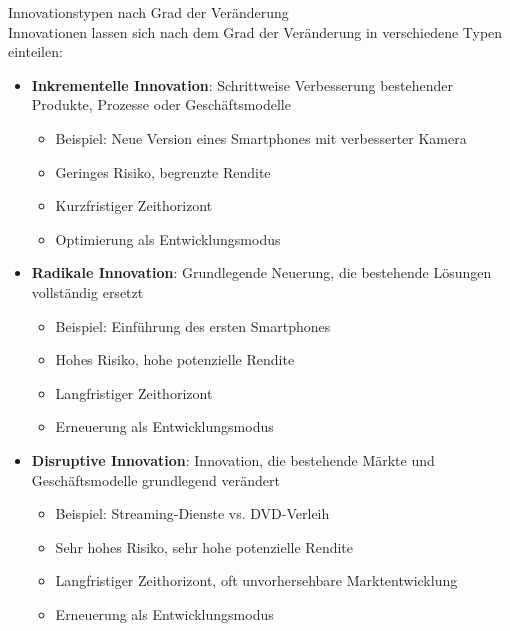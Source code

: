 \begin{concept}{Innovationstypen nach Grad der Veränderung}\\
Innovationen lassen sich nach dem Grad der Veränderung in verschiedene Typen einteilen:
\begin{itemize}
    \item \textbf{Inkrementelle Innovation}: Schrittweise Verbesserung bestehender Produkte, Prozesse oder Geschäftsmodelle
    \begin{itemize}
        \item Beispiel: Neue Version eines Smartphones mit verbesserter Kamera
        \item Geringes Risiko, begrenzte Rendite
        \item Kurzfristiger Zeithorizont
        \item Optimierung als Entwicklungsmodus
    \end{itemize}
    \item \textbf{Radikale Innovation}: Grundlegende Neuerung, die bestehende Lösungen vollständig ersetzt
    \begin{itemize}
        \item Beispiel: Einführung des ersten Smartphones
        \item Hohes Risiko, hohe potenzielle Rendite
        \item Langfristiger Zeithorizont
        \item Erneuerung als Entwicklungsmodus
    \end{itemize}
    \item \textbf{Disruptive Innovation}: Innovation, die bestehende Märkte und Geschäftsmodelle grundlegend verändert
    \begin{itemize}
        \item Beispiel: Streaming-Dienste vs. DVD-Verleih
        \item Sehr hohes Risiko, sehr hohe potenzielle Rendite
        \item Langfristiger Zeithorizont, oft unvorhersehbare Marktentwicklung
        \item Erneuerung als Entwicklungsmodus
    \end{itemize}
\end{itemize}
\end{concept}

